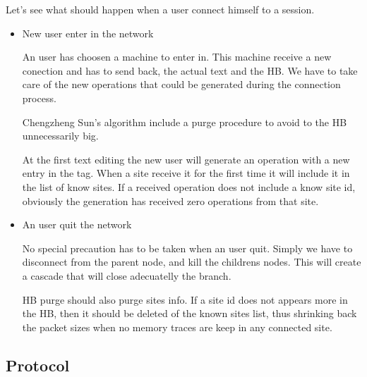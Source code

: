 \documentclass{article}
\begin{document}
Let's see what should happen when a user connect himself to a session.
\begin{itemize}
\item New user enter in the network

An user has choosen a machine to enter in. This machine receive a new conection and has to send back, the actual text and the HB. We have to take care  of the new operations that could be generated during the connection process.

Chengzheng Sun's algorithm include a purge procedure to avoid to the HB  unnecessarily big.

At the first text editing the new user will generate an operation with a new entry in the tag. When a site receive it for the first time it will include it in the list of know sites. If a received operation does not include a know site id, obviously the generation has received zero operations from that site.

\item An user quit the network

No special precaution has to be taken when an user quit. Simply we have to disconnect from the parent node, and kill the childrens nodes. This will create a cascade that will close adecuatelly the branch.



      
HB purge should also purge sites info. If a site id does not appears more in the HB, then it should be deleted of the known sites list, thus shrinking back the packet sizes when no memory traces are keep in any connected site.
\end{itemize}

\subsection{Protocol}
\end{document}

